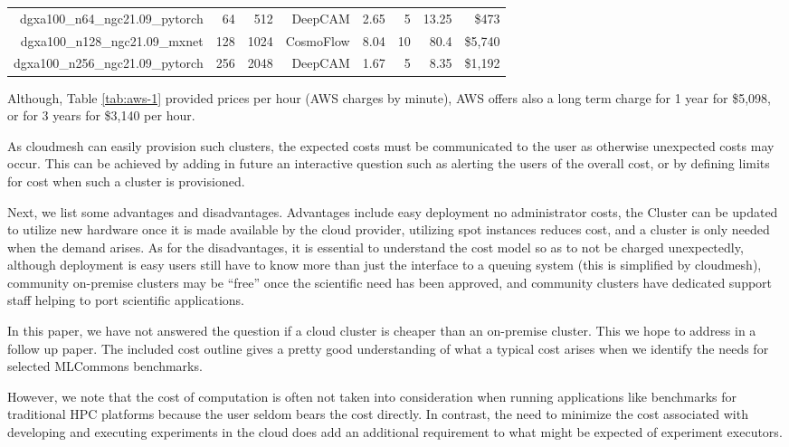 \documentclass[sigconf]{acmart}
\begin{document}
\begin{table}[h]
{\begin{tabular}{|r||r|r|r|r|r|r|r|}
 \hline
 dgxa100\_n64\_ngc21.09\_pytorch & 64  & 512  & DeepCAM & 2.65 &  5 & 13.25 & \$473 \\
 dgxa100\_n128\_ngc21.09\_mxnet  & 128 & 1024  & CosmoFlow & 8.04 &  10 & 80.4 & \$5,740\\
 dgxa100\_n256\_ngc21.09\_pytorch  & 256  & 2048  & DeepCAM & 1.67 &  5 & 8.35 & \$1,192\\ 
 \hline
\end{tabular}
}

\bigskip
\end{table}



Although, Table \ref{tab:aws-1} provided prices per hour (AWS charges by minute), AWS offers also a long term charge for 1 year for \$5,098, or for 3 years for   
 \$3,140 per hour. 
 
As cloudmesh can easily provision such clusters, the expected costs must be communicated to the user as otherwise unexpected costs may occur. This can be achieved by adding in future an interactive question such as alerting the users of the overall cost, or by defining limits for cost when such a cluster is provisioned.

Next, we list some advantages and disadvantages. Advantages include easy deployment no administrator costs, the Cluster can be updated to utilize new hardware once it is made available by the cloud provider, utilizing spot instances reduces cost, and a cluster is only needed when the demand arises. As for the disadvantages, it is essential to understand the cost model so as to not be charged unexpectedly, although deployment is easy users still have to know more than just the interface to a queuing system (this is simplified by cloudmesh), community on-premise clusters may be ``free'' once the scientific need has been approved, and community clusters have dedicated support staff helping to port scientific applications.

In this paper, we have not answered the question if a cloud cluster is cheaper than an on-premise cluster. This we hope to address in a follow up paper. The included cost outline gives a pretty good understanding of what a typical cost arises when we identify the needs for selected MLCommons benchmarks.

However, we note that the cost of computation is often not taken into consideration when running applications like benchmarks for traditional HPC platforms because the user seldom bears the cost directly. In contrast, the need to minimize the cost associated with developing and executing experiments in the cloud does add an additional requirement to what might be expected of experiment executors.
\end{document}
